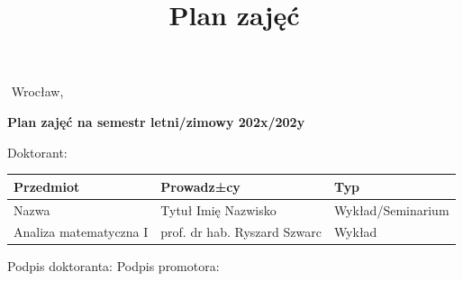 \documentclass[12pt]{article}
\title{Plan zajęć}
\author{}
\date{}
\begin{document}
$ $\hspace{12cm} Wrocław, \\
\begin{center}
    \textbf{Plan zajęć na semestr letni/zimowy 202x/202y}
\end{center}
Doktorant: 
\begin{center}
\begin{tabular}{|l|l|l|}
 \hline
 Przedmiot & Prowadz±cy & Typ\\ [0.5ex]
 \hline
 Nazwa  & Tytuł Imię Nazwisko & Wykład/Seminarium \\
 \hline
 Analiza matematyczna I & prof. dr hab. Ryszard Szwarc & Wykład\\
 \hline
\end{tabular}
\end{center}
Podpis doktoranta:\hspace{8cm} Podpis promotora:\\
\end{document}

